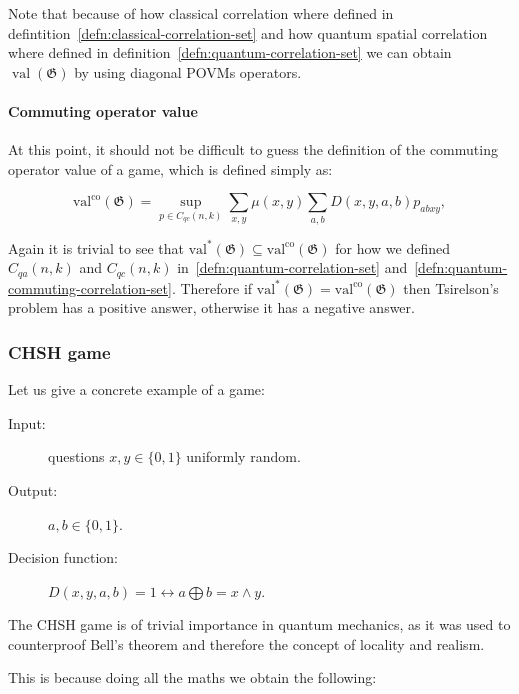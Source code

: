 Note that because of how classical correlation where defined in defintition~\ref{defn:classical-correlation-set} and how quantum spatial correlation where defined in definition~\ref{defn:quantum-correlation-set} we can obtain $\operatorname{val}(\mathfrak{G})$ by using diagonal POVMs operators.  

\paragraph{Commuting operator value}

At this point, it should not be difficult to guess the definition of the commuting operator value of a game, which is defined simply as:

\begin{defn}
    \begin{equation}
    \operatorname{val^\text{co}}(\mathfrak{G})=\sup _{p \in C_{q c}(n, k)} \sum_{x, y} \mu(x, y) \sum_{a, b} D(x, y, a, b) p_{a b x y},
    \end{equation}
\end{defn}

Again it is trivial to see that $\operatorname{val^{*}}(\mathfrak{G}) \subseteq \operatorname{val^\text{co}}(\mathfrak{G})$ for how we defined $C_{q a}(n, k)$ and $C_{q c}(n, k)$ in~\ref{defn:quantum-correlation-set} and~\ref{defn:quantum-commuting-correlation-set}.
Therefore if $\operatorname{val^{*}}(\mathfrak{G}) = \operatorname{val^\text{co}}(\mathfrak{G})$ then Tsirelson's problem has a positive answer, otherwise it has a negative answer.


\subsubsection{CHSH game}

Let us give a concrete example of a game:
\begin{description}
\item[Input:]questions $x,y \in \{0,1\}$ uniformly random.
\item[Output:]$a,b \in \{0,1\}$.
\item[Decision function: ]$D(x, y, a, b) = 1 \leftrightarrow a \bigoplus b = x \land y $. 
\end{description}

The CHSH game is of trivial importance in quantum mechanics, as it was used to counterproof Bell's theorem and therefore the concept of locality and realism.


This is because  doing all the maths we obtain the following:

